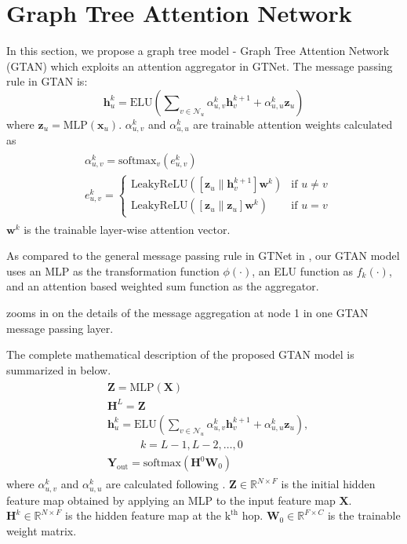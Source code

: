 \documentclass[lettersize,journal]{IEEEtran}
\theoremstyle{plain}
\theoremstyle{definition}
\theoremstyle{remark}
\begin{document}
\section{Graph Tree Attention Network}
\label{GTAN}
In this section, we propose a graph tree model - Graph Tree Attention Network (GTAN) which exploits an attention aggregator in GTNet. The message passing rule in GTAN is:
\begin{equation}
	\label{eqn:gtan_node}
	\bm{h}_u^k = \text{ELU}\left( \sum\nolimits_{v\in \mathcal{N}_u} \alpha_{u,v}^k \bm{h}_v^{k+1} + \alpha_{u,u}^k \bm{z}_u \right)
\end{equation}
where $\bm{z}_u = \text{MLP}(\bm{x}_u)$. $\alpha_{u,v}^k$ and $\alpha_{u,u}^k$ are trainable attention weights calculated as
\begin{align}
	\label{eqn:attention_weight}
	\begin{split}
		&\alpha_{u,v}^k = \text{softmax}_v\left(e_{u,v}^k\right) \\
		&e_{u,v}^k =
		\begin{cases}
			\text{LeakyReLU} \left( \left[\bm{z}_u \parallel \bm{h}_v^{k+1}\right] \bm{w}^k \right) & \text{if $u \neq v$}\\
			\text{LeakyReLU} \left( \left[\bm{z}_u \parallel \bm{z}_u\right] \bm{w}^k \right) & \text{if $u = v$}
		\end{cases}
	\end{split}
\end{align}
$\bm{w}^k$ is the trainable layer-wise attention vector.

As compared to the general message passing rule in GTNet in , our GTAN model uses an MLP as the transformation function $\phi(\cdot)$, an ELU function as $f_k(\cdot)$, and an attention based weighted sum function as the aggregator.

 zooms in on the details of the message aggregation at node 1 in one GTAN message passing layer. 

The complete mathematical description of the proposed GTAN model is summarized in below.
\begin{align}
	\label{eqn:GTAN}
	\begin{split}
		&\bm{Z} = \text{MLP}\left(\bm{X}\right) \\
		&\bm{H}^L = \bm{Z} \\
		&\bm{h}_u^k = \text{ELU}\left( \sum\nolimits_{v\in \mathcal{N}_u} \alpha_{u,v}^k \bm{h}_v^{k+1} + \alpha_{u,u}^k \bm{z}_u \right), \\
		&\quad \qquad k = L-1, L-2, \ldots, 0 \\
		&\bm{Y}_{\text{out}} = \text{softmax}\left(\bm{H}^0 \bm{W}_0\right)
	\end{split}
\end{align}
where $\alpha_{u,v}^k$ and $\alpha_{u,u}^k$ are calculated following . $\bm{Z} \in \mathbb{R}^{N \times F}$ is the initial hidden feature map obtained by applying an MLP to the input feature map $\bm{X}$. $\bm{H}^k \in \mathbb{R}^{N \times F}$ is the hidden feature map at the $\text{k}^\text{th}$ hop. $\bm{W}_0 \in \mathbb{R}^{F \times C}$ is the trainable weight matrix.
\end{document}

